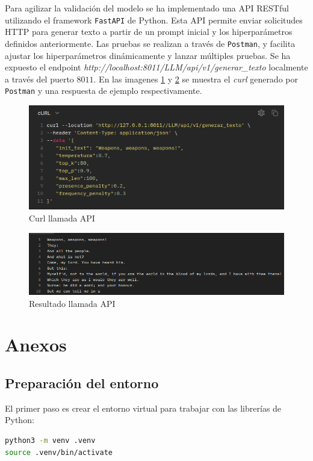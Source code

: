 \documentclass[11pt]{book}
\newcommand{\clearemptydoublepage}{\newpage{\pagestyle{empty}\cleardoublepage}}
\begin{document}
Para agilizar la validación del modelo se ha implementado una API RESTful utilizando el framework \texttt{FastAPI} de Python. Esta API permite enviar solicitudes HTTP para generar texto a partir de un prompt inicial y los hiperparámetros definidos anteriormente. Las pruebas se realizan a través de \texttt{Postman}, y facilita ajustar los hiperparámetros dinámicamente y lanzar múltiples pruebas. Se ha expuesto el endpoint \textit{http://localhost:8011/LLM/api/v1/generar\_texto} localmente a través del puerto $8011$. En las imagenes \ref{fig:placeholder27} y \ref{fig:placeholder28} se muestra el \textit{curl} generado por \texttt{Postman} y una respuesta de ejemplo respectivamente.

\begin{figure}[h]
    \centering
    \includegraphics[width=0.5\linewidth]{img/api_curl.png}
    \caption{Curl llamada API}
    \label{fig:placeholder27}
\end{figure}

\begin{figure}[h]
    \centering
    \includegraphics[width=0.5\linewidth]{img/api_res.png}
    \caption{Resultado llamada API}
    \label{fig:placeholder28}
\end{figure}

\clearemptydoublepage

\printbibliography[title={Referencias Bibliográficas}]

\appendix 
\chapter{Anexos}

\section{Preparación del entorno} \label{sec:entorno}

El primer paso es crear el entorno virtual para trabajar con las librerías de Python:
\begin{lstlisting}[language=bash]
python3 -m venv .venv
source .venv/bin/activate
\end{lstlisting}
\end{document}
